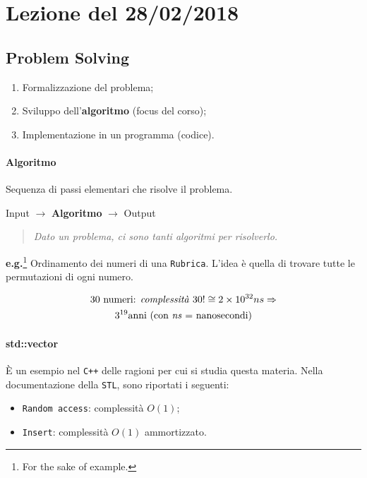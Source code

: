 \section{Lezione del 28/02/2018}

\subsection{Problem Solving}
\begin{enumerate}
	\item Formalizzazione del problema;
	\item Sviluppo dell'\textbf{algoritmo} (focus del corso);
	\item Implementazione in un programma (codice).
\end{enumerate}

\paragraph{Algoritmo} Sequenza di passi elementari che risolve il problema.\par

\begin{center}
	Input $\rightarrow$ \textbf{Algoritmo} $\rightarrow$ Output
\end{center}

\begin{quote} 
	\textit{Dato un problema, ci sono tanti algoritmi per risolverlo.}
\end{quote}

\noindent \textbf{e.g.}\footnote{For the sake of example.} Ordinamento dei numeri di una \texttt{Rubrica}.
L'idea è quella di trovare tutte le permutazioni di ogni numero.\par
\begin{gather*}
	\text{30 numeri: \textit{complessità} } 30! \cong 2 \times 10^{32}ns \Rightarrow \\
	3^{19} \text{anni (con \textit{ns} = nanosecondi)}
\end{gather*}

\paragraph{std::vector} È un esempio nel \texttt{C++} delle ragioni per cui 
si studia questa materia. Nella documentazione della \texttt{STL}, 
sono riportati i seguenti:

\begin{itemize}
	\item \texttt{Random access}: complessità $O(1)$;
	\item \texttt{Insert}: complessità $O(1)$ ammortizzato.
\end{itemize}

